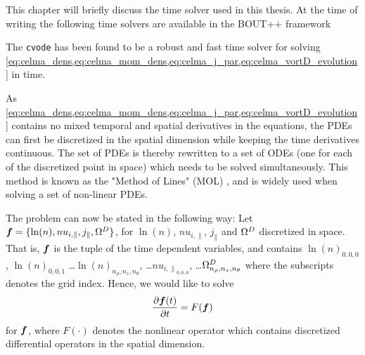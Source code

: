 This chapter will briefly discuss the time solver used in this thesis.
At the time of writing the following time solvers are available in the BOUT++ framework

The \texttt{cvode}\cite{Hindmarsh2012book} has been found to be a robust and fast time solver for solving \cref{eq:celma_dens,eq:celma_mom_dens,eq:celma_j_par,eq:celma_vortD_evolution} in time.

As \cref{eq:celma_dens,eq:celma_mom_dens,eq:celma_j_par,eq:celma_vortD_evolution} contains no mixed temporal and spatial derivatives in the equations, the PDEs can first be discretized in the spatial dimension while keeping the time derivatives continuous.
The set of PDEs is thereby rewritten to a set of ODEs (one for each of the discretized point in space) which needs to be solved simultaneously.
This method is known as the "Method of Lines" (MOL) \cite{Leveque2007book}, and is widely used when solving a set of non-linear PDEs.

The problem can now be stated in the following way:
Let $\boldsymbol{f} = \{\ln(n), nu_{i,\|}, j_\|, \Omega^D\}$, for $\ln(n)$, $nu_{i,\|}$, $j_\|$ and $\Omega^D$ discretized in space.
That is, $\boldsymbol{f}$ is the tuple of the time dependent variables, and contains $\ln(n)_{0,0,0}$, $\ln(n)_{0,0,1}$ \ldots $\ln(n)_{n_\rho,n_z,n_\theta}$, \ldots $nu_{{i,\|}_{0,0,0}}$, \ldots $\Omega^D_{n_\rho,n_z,n_\theta}$ where the subscripts denotes the grid index.
Hence, we would like to solve
%
\begin{align}
    \frac{\partial {\boldsymbol{f}(t)}}{\partial{t}} = F(\boldsymbol{f})
    \label{eq:MOL}
\end{align}
%
for $\boldsymbol{f}$, where $F(\cdot)$ denotes the nonlinear operator which contains discretized differential operators in the spatial dimension.

